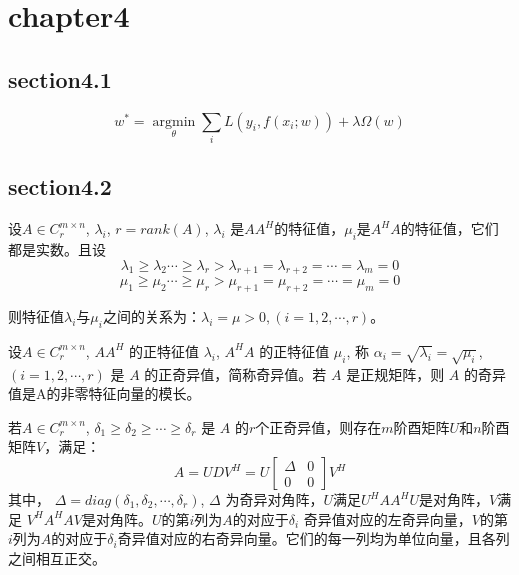 \chapter{chapter4}
\section{section4.1}


\begin{equation}
	w^* = \mathop{\arg\min}\limits_{\theta} \sum\limits_{i} L(y_i, f(x_i;w)) + \lambda\Omega(w)
\end{equation}


\section{section4.2}

设$ A\in C_r^{m \times n} $, $ \lambda_i $, $ r = rank(A) $, $ \lambda_i $  是$ A A^H $的特征值，$ \mu_i $是$ A^H A $的特征值，它们都是实数。且设
\begin{displaymath}
	\lambda_1 \geq \lambda_2 \cdots \geq \lambda_r > \lambda_{r+1} = \lambda_{r+2} = \cdots=\lambda_m = 0
\end{displaymath}
\begin{displaymath}
	\mu_1 \geq \mu_2 \cdots \geq \mu_r > \mu_{r+1} = \mu_{r+2} = \cdots = \mu_m = 0
\end{displaymath}

则特征值$ \lambda_i $与$ \mu_i $之间的关系为：$ \lambda_i = \mu >0,(i=1,2,\cdots,r) $。

设$ A\in C_r^{m \times n} $, $ A A^H $ 的正特征值 $ \lambda_i $, $ A^H A $ 的正特征值 $ \mu_i $, 称 $ \alpha_i = \sqrt{\lambda_i} = \sqrt{\mu_i} $, $ (i = 1, 2,\cdots,r) $ 是 $ A $ 的正奇异值，简称奇异值。若 $ A $ 是正规矩阵，则 $ A $ 的奇异值是A的非零特征向量的模长。

若$ A\in C_r^{m \times n} $, $ \delta_1 \geq \delta_2 \geq \cdots \geq \delta_r $ 是 $ A $ 的$ r $个正奇异值，则存在$ m $阶酉矩阵$ U $和$ n $阶酉矩阵$ V $，满足：
\begin{displaymath}
	A = UDV^H = U \begin{bmatrix} \Delta & 0 \\ 0 & 0 \end{bmatrix} V^H
\end{displaymath} 
其中， $ \Delta = diag(\delta_1,\delta_2,\cdots,\delta_r) $, $ \Delta $ 为奇异对角阵，$ U $满足$ U^H A A^H U$是对角阵，$ V $满足 $ V^H A^H AV $是对角阵。$ U $的第$ i $列为$ A $的对应于$ \delta_i $ 奇异值对应的左奇异向量，$ V $的第$ i $列为$ A $的对应于$ \delta_i $奇异值对应的右奇异向量。它们的每一列均为单位向量，且各列之间相互正交。


